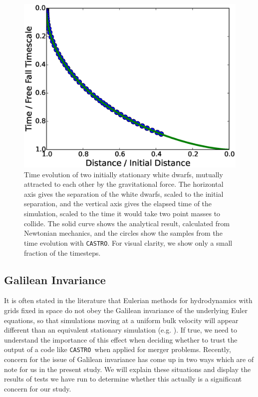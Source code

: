 \documentclass[iop]{../emulateapj}
\newcommand{\castro}{\texttt{CASTRO}}
\begin{document}
\begin{figure}
  \centering
  \includegraphics[scale=0.45]{plots/freefall}
  \caption{Time evolution of two initially stationary white dwarfs,
    mutually attracted to each other by the gravitational force. The
    horizontal axis gives the separation of the white dwarfs, scaled
    to the initial separation, and the vertical axis gives the elapsed
    time of the simulation, scaled to the time it would take two point masses
    to collide. The solid curve shows the analytical result,
    calculated from Newtonian mechanics, and the circles show the
    samples from the time evolution with \castro. For visual clarity, we 
    show only a small fraction of the timesteps.}
  \label{fig:freefall}
\end{figure}

\subsection{Galilean Invariance}\label{sec:galileo}

It is often stated in the literature that Eulerian methods for
hydrodynamics with grids fixed in space do not obey the Galilean
invariance of the underlying Euler equations, so that simulations
moving at a uniform bulk velocity will appear different than an
equivalent stationary simulation (e.g. \cite{arepo}). If true, we need to understand 
the importance of this effect when deciding whether to trust the 
output of a code like \castro\ when applied for merger problems.
Recently, concern for the issue of Galilean invariance has come up in two ways which are of note for us 
in the present study. We will explain these situations and display 
the results of tests we have run to determine whether this 
actually is a significant concern for our study.
\end{document}
